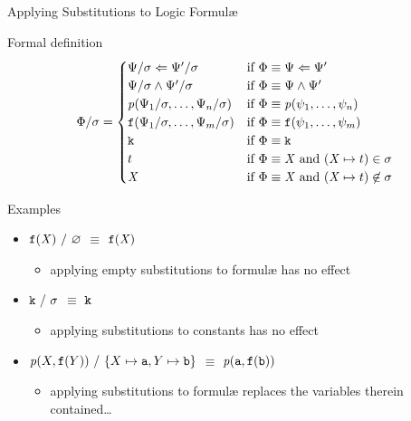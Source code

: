 \documentclass[presentation]{beamer}\mode<presentation>{\usetheme{AMSBolognaFC}}
\begin{document}
\begin{frame}[allowframebreaks]{Applying Substitutions to Logic Formul\ae{}}
\begin{alertblock}{Formal definition}
		$$\Phi / \sigma = \begin{cases}
			\Psi / \sigma \Leftarrow \Psi' / \sigma & \text{if} ~ \Phi \equiv \Psi \Leftarrow \Psi'
			\\
			\Psi / \sigma \wedge \Psi' / \sigma & \text{if} ~ \Phi \equiv \Psi \wedge \Psi'
			\\
			\text{\textit{p}}(\Psi_1 / \sigma, \ldots, \Psi_n / \sigma) & \text{if} ~ \Phi \equiv \text{\textit{p}}(\psi_1, \ldots, \psi_n)
			\\
			\mathtt{f}(\Psi_1 / \sigma, \ldots, \Psi_m / \sigma) & \text{if} ~ \Phi \equiv \mathtt{f}(\psi_1, \ldots, \psi_m)
			\\
			\mathtt{k} & \text{if} ~ \Phi \equiv \mathtt{k}
			\\
			t & \text{if} ~ \Phi \equiv \mathit{X} ~ \text{and} ~ (\mathit{X} \mapsto t) \in \sigma
			\\
			\mathit{X} & \text{if} ~ \Phi \equiv \mathit{X} ~ \text{and} ~ (\mathit{X} \mapsto t) \not\in \sigma
		\end{cases}$$
    \end{alertblock}

    \begin{exampleblock}{Examples}
        \begin{itemize}
            \item[] \alert{$\functor{f}(\variable{X}) \ /\  \varnothing$} $\equiv$ $\mathtt{f}(\mathit{X})$
			\begin{itemize}
				\item applying empty substitutions to formul\ae{} has no effect
			\end{itemize} 

			\item[] \alert{$\functor{k} \ /\  \sigma$} $\equiv$ $\mathtt{k}$
			\begin{itemize}
				\item applying substitutions to constants has no effect
			\end{itemize} 

			\item[] \alert{$\text{\textit{p}}(X, \mathtt{f}(Y)) \ /\  \{ X \mapsto \mathtt{a}, Y \mapsto \mathtt{b} \}$} $\equiv$ $\text{\textit{p}}(\mathtt{a}, \mathtt{f}(\mathtt{b}))$
			\begin{itemize}
				\item applying substitutions to formul\ae{} replaces the variables therein contained\ldots
			\end{itemize} 


\end{itemize}
\end{exampleblock}
\end{frame}
\end{document}
